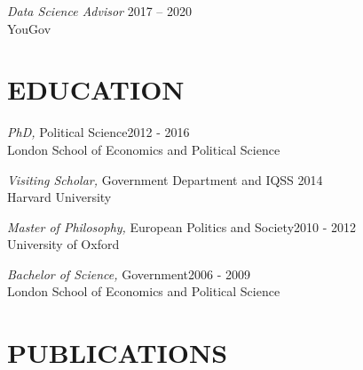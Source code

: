 \documentclass[centered]{res}
\begin{document}
\begin{resume}
{\sl Data Science Advisor} \hfill 2017 -- 2020\\
YouGov


\section{EDUCATION} 

\vspace{.5cm}

		{\sl PhD,} Political Science\hfill 2012 - 2016\\
                London School of Economics and Political Science

		{\sl Visiting Scholar,} Government Department and IQSS \hfill  2014\\
                 Harvard University  

		{\sl Master of Philosophy,} European Politics and Society\hfill 2010 - 2012 \\
                University of Oxford

		{\sl Bachelor of Science,} Government\hfill 2006 - 2009 \\
                London School of Economics and Political Science

\section{PUBLICATIONS} 

\vspace{.5cm}


\end{resume}
\end{document}
